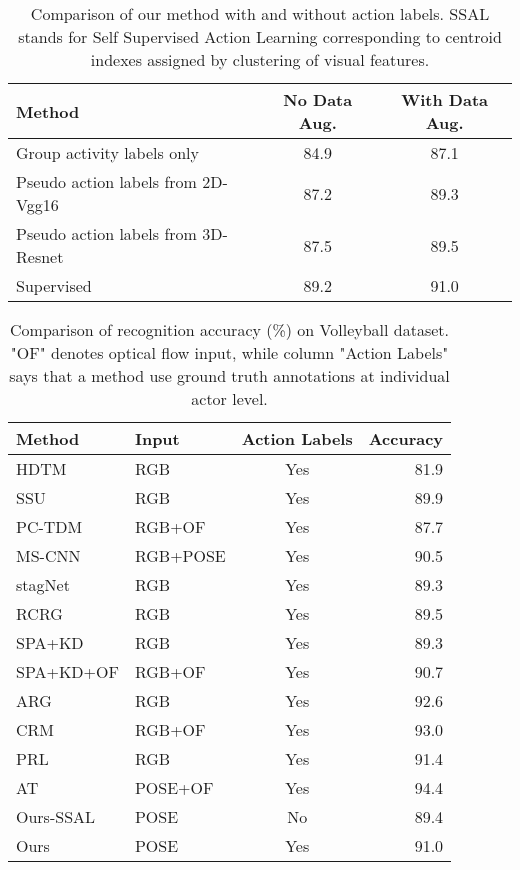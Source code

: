 \documentclass[a4paper,conference]{IEEEtran}
\begin{document}
\begin{table}
    \centering
\begin{tabular}{ l  c c } 
    \hline
    Method & No Data Aug. & With Data Aug. \\ [0.5ex] 
    \hline
    Group activity labels only& 84.9 & 87.1 \\ 
    Pseudo action labels from 2D-Vgg16 & 87.2 & 89.3 \\
    Pseudo action labels from 3D-Resnet & 87.5 & 89.5 \\
    Supervised & 89.2 & 91.0 \\
    \hline
    
    \end{tabular}
    
\caption{Comparison of our method with and without action labels. SSAL stands for Self Supervised Action Learning corresponding to centroid indexes assigned by clustering of visual features.}
\label{tab:selfsupervised_baselines}
\end{table}
\begin{table}
    \centering
\begin{tabular}{ l l c r } 
    \hline
    Method & Input & Action Labels & Accuracy \\ [0.5ex] 
    \hline
    HDTM \cite{msibrahiCVPR16deepactivity} & RGB & Yes & 81.9 \\ 
    SSU \cite{bagautdinov2017social} & RGB & Yes & 89.9 \\
    PC-TDM \cite{yan2018participation} & RGB+OF & Yes & 87.7 \\
    MS-CNN \cite{azar2018multi} & RGB+POSE & Yes & 90.5 \\
    stagNet \cite{qi2018stagnet} & RGB & Yes & 89.3 \\
    RCRG \cite{ibrahim2018hierarchical} & RGB & Yes & 89.5 \\
    SPA+KD \cite{tang2019learning} & RGB & Yes & 89.3 \\
    SPA+KD+OF \cite{tang2019learning} & RGB+OF & Yes & 90.7 \\
    ARG \cite{wu2019learning} & RGB & Yes & 92.6 \\
    CRM \cite{mokhtarzadeh2019convolutional} & RGB+OF & Yes & 93.0 \\
    PRL \cite{hu2019progressive}& RGB & Yes & 91.4 \\
    AT \cite{cvpr2020transformer}& POSE+OF & Yes & 94.4 \\
    \hline
    Ours-SSAL & POSE & No & 89.4 \\
    Ours & POSE & Yes & 91.0 \\
    \hline
    \end{tabular}
    
\caption{Comparison of recognition accuracy (\%) on Volleyball dataset. "OF" denotes optical flow input, while column "Action Labels" says that a method use ground truth annotations at individual actor level.}
\label{tab:sota_comparison}
\end{table}
\end{document}
